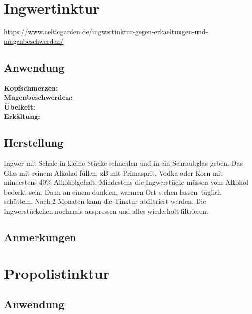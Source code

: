 \newpage


\section{Ingwertinktur}

\url{https://www.celticgarden.de/ingwertinktur-gegen-erkaeltungen-und-magenbeschwerden/}

   

\subsection{Anwendung}

\textbf{Kopfschmerzen:} \\ 

\textbf{Magenbeschwerden:} \\ 

\textbf{Übelkeit:} \\ 

\textbf{Erkältung:} \\ 


\subsection{Herstellung}

Ingwer mit Schale in kleine Stücke schneiden und in ein Schraubglas geben. Das Glas mit reinem Alkohol füllen, zB mit Primasprit, Vodka oder Korn mit mindestens 40\% Alkoholgehalt. Mindestens die Ingwerstücke müssen vom Alkohol bedeckt sein. Dann an einem dunklen, warmen Ort stehen lassen, täglich schütteln. Nach 2 Monaten kann die Tinktur abfiltriert werden. Die Ingwerstückchen nochmals auspressen und alles wiederholt filtrieren.

\subsection{Anmerkungen}


\newpage


\section{Propolistinktur}

  

\subsection{Anwendung}

